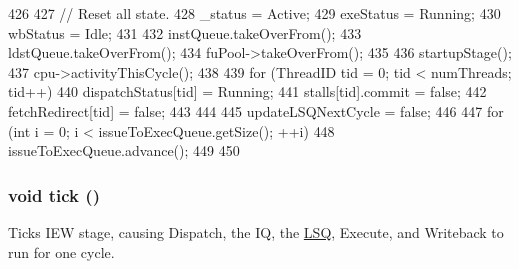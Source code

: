 \begin{DoxyCode}
426 {
427     // Reset all state.
428     _status = Active;
429     exeStatus = Running;
430     wbStatus = Idle;
431 
432     instQueue.takeOverFrom();
433     ldstQueue.takeOverFrom();
434     fuPool->takeOverFrom();
435 
436     startupStage();
437     cpu->activityThisCycle();
438 
439     for (ThreadID tid = 0; tid < numThreads; tid++) {
440         dispatchStatus[tid] = Running;
441         stalls[tid].commit = false;
442         fetchRedirect[tid] = false;
443     }
444 
445     updateLSQNextCycle = false;
446 
447     for (int i = 0; i < issueToExecQueue.getSize(); ++i) {
448         issueToExecQueue.advance();
449     }
450 }
\end{DoxyCode}
\hypertarget{classDefaultIEW_a873dd91783f9efb4a590aded1f70d6b0}{
\subsubsection[{tick}]{\setlength{\rightskip}{0pt plus 5cm}void tick ()}}
\label{classDefaultIEW_a873dd91783f9efb4a590aded1f70d6b0}
Ticks IEW stage, causing Dispatch, the IQ, the \hyperlink{classLSQ}{LSQ}, Execute, and Writeback to run for one cycle. 


